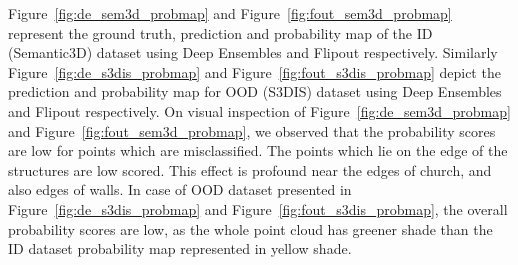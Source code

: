     Figure~\ref{fig:de_sem3d_probmap} and Figure~\ref{fig:fout_sem3d_probmap} represent the ground truth, prediction and probability map of the ID (Semantic3D) dataset using Deep Ensembles and Flipout respectively.
    Similarly Figure~\ref{fig:de_s3dis_probmap} and Figure~\ref{fig:fout_s3dis_probmap} depict the prediction and probability map for OOD (S3DIS) dataset using Deep Ensembles and Flipout respectively.
    On visual inspection of Figure~\ref{fig:de_sem3d_probmap} and Figure~\ref{fig:fout_sem3d_probmap}, we observed that the probability scores are low for points which are misclassified.
    The points which lie on the edge of the structures are low scored.
    This effect is profound near the edges of church, and also edges of walls.
    In case of OOD dataset presented in Figure~\ref{fig:de_s3dis_probmap} and Figure~\ref{fig:fout_s3dis_probmap}, the overall probability scores are low, as the whole point cloud has greener shade than the ID dataset probability map represented in yellow shade.

